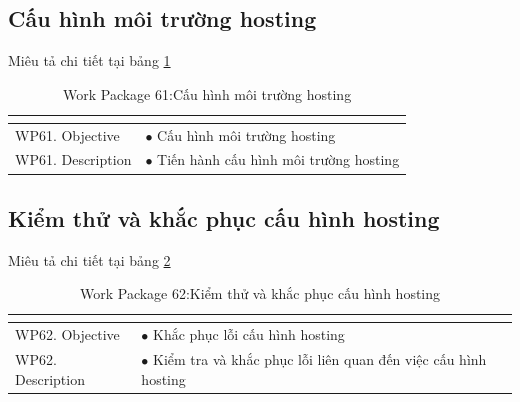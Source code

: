 \documentclass[a4paper]{book}
\begin{document}
\subsection{Cấu hình môi trường hosting} Miêu tả chi tiết tại bảng \ref{table:cauhinhmoitruonghosting}
\begin{table}[h!]
	\begin{center}
		\begin{tabular}{|p{4cm}|p{10cm}|}
			\hline
			\multicolumn{2}{|c|}{\cellcolor[HTML]{363636}{\color[HTML]{FFFFFF}Work package 61: Cấu hình môi trường hosting}}\\
			\hline
			\multirow{1}{*}{WP61. Objective} & $\bullet$ Cấu hình môi trường hosting\\
			\hline
			\multirow{1}{*}{WP61. Description} & $\bullet$ Tiến hành cấu hình môi trường hosting \\
			\hline
		\end{tabular}
		\caption{Work Package 61:Cấu hình môi trường hosting}
		\label{table:cauhinhmoitruonghosting}
	\end{center}
\end{table}
\subsection{Kiểm thử và khắc phục cấu hình hosting} Miêu tả chi tiết tại bảng \ref{table:kt_kp_cauhinhhostting}
\begin{table}[h!]
	\begin{center}
		\begin{tabular}{|p{4cm}|p{10cm}|}
			\hline
			\multicolumn{2}{|c|}{\cellcolor[HTML]{363636}{\color[HTML]{FFFFFF}Work package 62: Kiểm thử và khắc phục cấu hình hosting}}\\
			\hline
			\multirow{1}{*}{WP62. Objective} & $\bullet$ Khắc phục lỗi cấu hình hosting\\
			\hline
			\multirow{1}{*}{WP62. Description} & $\bullet$ Kiểm tra và khắc phục lỗi liên quan đến việc cấu hình hosting \\
			\hline
		\end{tabular}
		\caption{Work Package 62:Kiểm thử và khắc phục cấu hình hosting}
		\label{table:kt_kp_cauhinhhostting}
	\end{center}
\end{table}
\end{document}
